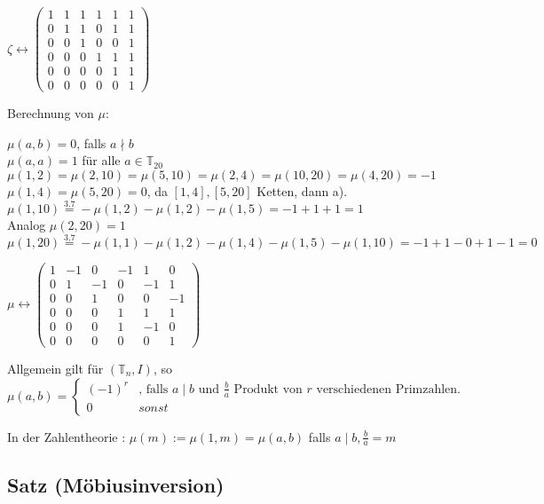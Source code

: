 \begin{enumerate}
	$\zeta \leftrightarrow
	\begin{pmatrix}
	1 & 1 & 1 & 1 & 1 & 1 \\
	0 & 1 & 1 & 0 & 1 & 1 \\
	0 & 0 & 1 & 0 & 0 & 1 \\
	0 & 0 & 0 & 1 & 1 & 1 \\
	0 & 0 & 0 & 0 & 1 & 1 \\
	0 & 0 & 0 & 0 & 0 & 1
	\end{pmatrix}$
	
	Berechnung von $\mu$:
	
	$\mu(a, b) = 0$, falls $a\nmid b$ 
	\\$\mu(a, a) = 1$ für alle $a \in \mathbb{T}_{20}$
	\\$\mu(1, 2) = \mu(2, 10) = \mu(5, 10) = \mu(2, 4) = \mu(10, 20) = \mu(4, 20) = -1$
	\\$\mu(1, 4) = \mu(5, 20) = 0$, da $[1, 4], [5, 20]$ Ketten, dann a).
	\\ $\mu(1, 10) \stackrel{3.7}{=} %
	-\mu(1, 2) - \mu(1, 2) - \mu(1, 5) = - 1 + 1 + 1 = 1$
	\\ Analog $\mu(2, 20) = 1$
	\\ $\mu(1, 20) \stackrel{3.7}{=} %
	-\mu(1, 1) - \mu(1, 2) - \mu(1, 4) - \mu(1,5) - \mu(1, 10) = -1 + 1 -0 +1 -1 = 0$
	
	
	$\mu \leftrightarrow
		\begin{pmatrix}
		1 & -1 & 0 & -1 & 1 & 0 \\
		0 & 1 & -1 & 0 & -1 & 1 \\
		0 & 0 & 1 & 0 & 0 & -1 \\
		0 & 0 & 0 & 1 & 1 & 1 \\
		0 & 0 & 0 & 1 & -1 & 0 \\
		0 & 0 & 0 & 0 & 0 & 1
		\end{pmatrix}$
	
	
	Allgemein gilt für $(\mathbb{T}_n, I)$, so 
	$\mu(a, b) = \begin{cases}
	(-1)^r & \text{, falls } a \mid b \text{ und } \frac{b}{a} \text{ Produkt von } r \text{ verschiedenen Primzahlen.} \\
	0 & sonst 
	\end{cases}$
	
	In der Zahlentheorie : 
	$\mu(m) := \mu(1, m) = \mu(a, b)$ falls $a\mid b, \frac{b}{a} = m$
	
	\subsection{Satz (Möbiusinversion)}  %
	

\end{enumerate}

